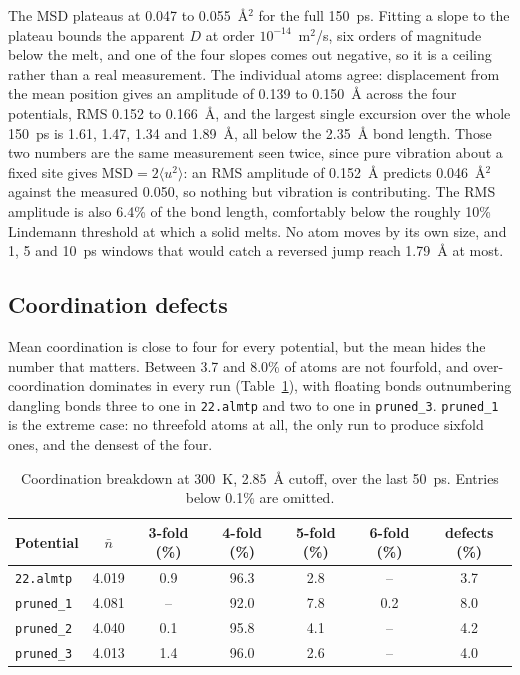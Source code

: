 \documentclass[11pt]{article}
\begin{document}
The MSD plateaus at 0.047 to 0.055~\AA$^2$ for the full 150~ps. Fitting a slope to the plateau bounds the apparent $D$ at order $10^{-14}$~m$^2$/s, six orders of magnitude below the melt, and one of the four slopes comes out negative, so it is a ceiling rather than a real measurement. The individual atoms agree: displacement from the mean position gives an amplitude of 0.139 to 0.150~\AA{} across the four potentials, RMS 0.152 to 0.166~\AA, and the largest single excursion over the whole 150~ps is 1.61, 1.47, 1.34 and 1.89~\AA, all below the 2.35~\AA{} bond length. Those two numbers are the same measurement seen twice, since pure vibration about a fixed site gives $\mathrm{MSD}=2\langle u^2\rangle$: an RMS amplitude of 0.152~\AA{} predicts 0.046~\AA$^2$ against the measured 0.050, so nothing but vibration is contributing. The RMS amplitude is also 6.4\% of the bond length, comfortably below the roughly 10\% Lindemann threshold at which a solid melts. No atom moves by its own size, and 1, 5 and 10~ps windows that would catch a reversed jump reach 1.79~\AA{} at most.

\subsection{Coordination defects}
\label{sec:defects}
Mean coordination is close to four for every potential, but the mean hides the number that matters. Between 3.7 and 8.0\% of atoms are not fourfold, and over-coordination dominates in every run (Table~\ref{tab:defects}), with floating bonds outnumbering dangling bonds three to one in \texttt{22.almtp} and two to one in \texttt{pruned\_3}. \texttt{pruned\_1} is the extreme case: no threefold atoms at all, the only run to produce sixfold ones, and the densest of the four.

\begin{table}[H]
\centering\footnotesize
\begin{tabular}{lcccccc}
\toprule
Potential & $\bar{n}$ & 3-fold (\%) & 4-fold (\%) & 5-fold (\%) & 6-fold (\%) & defects (\%) \\
\midrule
\texttt{22.almtp}  & 4.019 & 0.9 & 96.3 & 2.8 & --  & 3.7 \\
\texttt{pruned\_1} & 4.081 & --  & 92.0 & 7.8 & 0.2 & 8.0 \\
\texttt{pruned\_2} & 4.040 & 0.1 & 95.8 & 4.1 & --  & 4.2 \\
\texttt{pruned\_3} & 4.013 & 1.4 & 96.0 & 2.6 & --  & 4.0 \\
\bottomrule
\end{tabular}
\caption{Coordination breakdown at 300~K, 2.85~\AA{} cutoff, over the last 50~ps. Entries below 0.1\% are omitted.}
\label{tab:defects}
\end{table}
\end{document}
